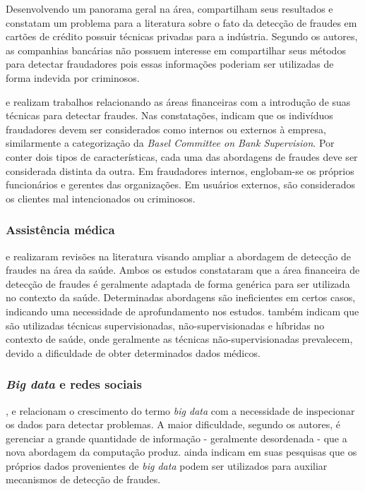 \documentclass[smallextended]{svjour3}
\begin{document}
Desenvolvendo um panorama geral na área, \cite{Allan2010} compartilham seus resultados e constatam um problema para a literatura sobre o fato da detecção de fraudes em cartões de crédito possuir técnicas privadas para a indústria. Segundo os autores, as companhias bancárias não possuem interesse em compartilhar seus métodos para detectar fraudadores pois essas informações poderiam ser utilizadas de forma indevida por criminosos.

\cite{Perlich2007} e \cite{Kanapickiene2015} realizam trabalhos relacionando as áreas financeiras com a introdução de suas técnicas para detectar fraudes. Nas constatações, indicam que os indivíduos fraudadores devem ser considerados como internos ou externos à empresa, similarmente a categorização da \emph{Basel Committee on Bank Supervision}. Por conter dois tipos de características, cada uma das abordagens de fraudes deve ser considerada distinta da outra. Em fraudadores internos, englobam-se os próprios funcionários e gerentes das organizações. Em usuários externos, são considerados os clientes mal intencionados ou criminosos.  

\subsubsection{Assistência médica}

\cite{Bauder2016} e \cite{Li2008} realizaram revisões na literatura visando ampliar a abordagem de detecção de fraudes na área da saúde. Ambos os estudos constataram que a área financeira de detecção de fraudes é geralmente adaptada de forma genérica para ser utilizada no contexto da saúde. Determinadas abordagens são ineficientes em certos casos, indicando uma necessidade de aprofundamento nos estudos. \cite{Bauder2016} também indicam que são utilizadas técnicas supervisionadas, não-supervisionadas e híbridas no contexto de saúde, onde geralmente as técnicas não-supervisionadas prevalecem, devido a dificuldade de obter determinados dados médicos.

\subsubsection{\emph{Big data} e redes sociais}

\cite{Feily2009}, \cite{Mahmood2013} e \cite{Sharma2015} relacionam o crescimento do termo \emph{big data} com a necessidade de inspecionar os dados para detectar problemas. A maior dificuldade, segundo os autores, é gerenciar a grande quantidade de informação - geralmente desordenada - que a nova abordagem da computação produz. \cite{Sharma2015} ainda indicam em suas pesquisas que os próprios dados provenientes de \emph{big data} podem ser utilizados para auxiliar mecanismos de detecção de fraudes.     
\end{document}
